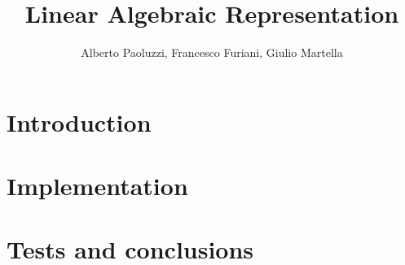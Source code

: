 \documentclass[10pt]{book}
\author{Alberto Paoluzzi, Francesco Furiani, Giulio Martella}
\title{Linear Algebraic Representation}
\begin{document}
\frontmatter
\maketitle
\tableofcontents

\mainmatter

\part{Introduction}


\part{Implementation}








\part{Tests and conclusions}




\backmatter


{}

\end{document}

